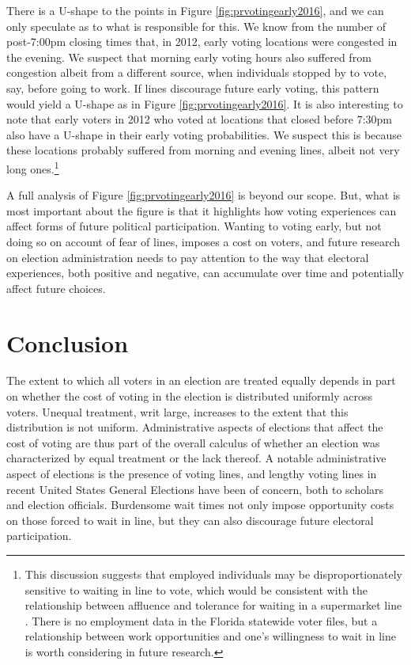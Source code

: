 \documentclass[12pt,titlepage]{article}
\begin{document}
There is a U-shape to the points in Figure
\ref{fig:prvotingearly2016}, and we can only speculate as to what is
responsible for this.  We know from the number of post-7:00pm closing
times that, in 2012, early voting locations were congested in the
evening.  We suspect that morning early voting hours also suffered
from congestion albeit from a different source, when individuals
stopped by to vote, say, before going to work.  If lines discourage
future early voting, this pattern would yield a U-shape as in Figure
\ref{fig:prvotingearly2016}.  It is also interesting to note that
early voters in 2012 who voted at locations that closed before 7:30pm
also have a U-shape in their early voting probabilities.  We suspect
this is because these locations probably suffered from morning and
evening lines, albeit not very long ones.\footnote{This discussion
  suggests that employed individuals may be disproportionately
  sensitive to waiting in line to vote, which would be consistent with
  the relationship between affluence and tolerance for waiting in a
  supermarket line \citep[e.g.,][]{bennett:waitinginlinechars}.  There
  is no employment data in the Florida statewide voter files, but a
  relationship between work opportunities and one's willingness to
  wait in line is worth considering in future research.}

A full analysis of Figure \ref{fig:prvotingearly2016} is beyond our
scope.  But, what is most important about the figure is that it 
highlights how voting experiences can affect forms of future political
participation.  Wanting to voting early, but not doing so on account
of fear of lines, imposes a cost on voters, and future research on
election administration needs to pay attention to the way that
electoral experiences, both positive and negative, can accumulate over
time and potentially affect future choices. 


\section*{Conclusion}

The extent to which all voters in an election are treated equally
depends in part on whether the cost of voting in the election is
distributed uniformly across voters.  Unequal treatment, writ large,
increases to the extent that this distribution is not uniform.
Administrative aspects of elections that affect the cost of voting are
thus part of the overall calculus of whether an election was
characterized by equal treatment or the lack thereof.  A notable
administrative aspect of elections is the presence of voting lines,
and lengthy voting lines in recent United States General Elections
have been of concern, both to scholars and election officials.
Burdensome wait times not only impose opportunity costs on those
forced to wait in line, but they can also discourage future electoral
participation.
\end{document}
